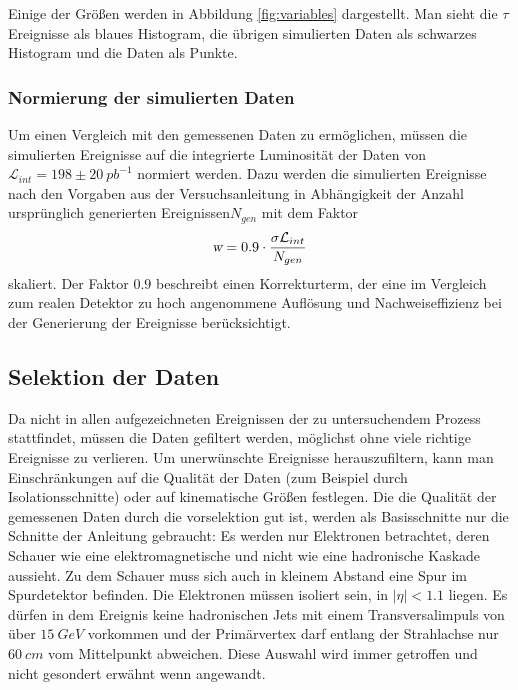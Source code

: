 \documentclass[a4paper,12pt]{article}
\begin{document}
Einige der Größen werden in Abbildung \ref{fig:variables} dargestellt. Man sieht die $τ$ Ereignisse
als blaues Histogram, die übrigen simulierten Daten als schwarzes Histogram und die Daten als
Punkte. 
\subsubsection*{Normierung der simulierten Daten}
Um einen Vergleich mit den gemessenen Daten zu ermöglichen, müssen die simulierten Ereignisse auf
die 
integrierte Luminosität der Daten von $\mathcal{L}_{int}=198 \pm \SI{20}{pb^{-1}}$ normiert werden.
Dazu werden die simulierten Ereignisse nach den Vorgaben aus der Versuchsanleitung\cite{versuchsanleitung}
in Abhängigkeit der Anzahl ursprünglich generierten Ereignissen$N_{gen}$ mit dem Faktor
\begin{align*}
	\textsl{w}= 0.9 \cdot \frac{\sigma \mathcal{L}_{int}}{N_{gen}}
\end{align*}
skaliert. Der Faktor $0.9$ beschreibt einen Korrekturterm, der eine im Vergleich zum realen Detektor
zu hoch angenommene Auflösung und Nachweiseffizienz bei der Generierung der Ereignisse berücksichtigt.


\subsection{Selektion der Daten}
Da nicht in allen aufgezeichneten Ereignissen der zu untersuchendem Prozess stattfindet, müssen die
Daten gefiltert werden, möglichst ohne viele richtige Ereignisse zu verlieren.
Um unerwünschte Ereignisse herauszufiltern, kann man Einschränkungen auf die Qualität der Daten (zum Beispiel
durch Isolationsschnitte) oder auf kinematische Größen festlegen.
Die die Qualität der gemessenen Daten durch die vorselektion gut ist, werden als Basisschnitte nur
die Schnitte der Anleitung gebraucht: Es werden nur
Elektronen betrachtet, deren Schauer wie eine elektromagnetische und nicht wie eine hadronische
Kaskade aussieht. Zu dem Schauer muss sich auch in kleinem Abstand eine Spur im Spurdetektor befinden.
Die Elektronen müssen isoliert sein, in $|\eta| < 1.1$ liegen. Es dürfen in dem Ereignis keine
hadronischen Jets mit einem Transversalimpuls von über $\SI{15}{GeV}$ vorkommen und der Primärvertex
darf entlang der Strahlachse nur $\SI{60}{cm}$ vom Mittelpunkt abweichen. Diese Auswahl wird immer
getroffen und nicht gesondert erwähnt wenn angewandt.
\end{document}
